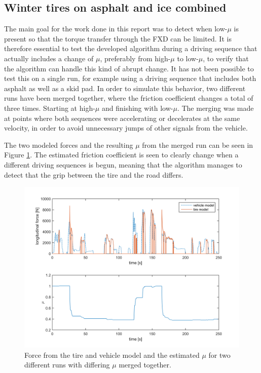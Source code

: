 \subsection{Winter tires on asphalt and ice combined}
The main goal for the work done in this report was to detect when low-$ \mu $ is present so that the torque transfer through the FXD can be limited. It is therefore essential to test the developed algorithm during a driving sequence that actually includes a change of $ \mu $, preferably from high-$ \mu $ to low-$ \mu $, to verify that the algorithm can handle this kind of abrupt change. It has not been possible to test this on a single run, for example using a driving sequence that includes both asphalt as well as a skid pad. In order to simulate this behavior, two different runs have been merged together, where the friction coefficient changes a total of three times. Starting at high-$ \mu $ and finishing with low-$ \mu $. The merging was made at points where both sequences were accelerating or decelerates at the same velocity, in order to avoid unnecessary jumps of other signals from the vehicle. 

The two modeled forces and the resulting $ \mu $ from the merged run can be seen in Figure \ref{force_mue_comb2}. The estimated friction coefficient is seen to clearly change when a different driving sequences is begun, meaning that the algorithm manages to detect that the grip between the tire and the road differs.
 
\begin{figure}[h]
	\centering
	\includegraphics[width=1.0\textwidth]{Pictures/force_mue_comb2}
	\caption {Force from the tire and vehicle model and the estimated $ \mu $ for two different runs with differing $ \mu $ merged together.}
	\label{force_mue_comb2}
\end{figure}

